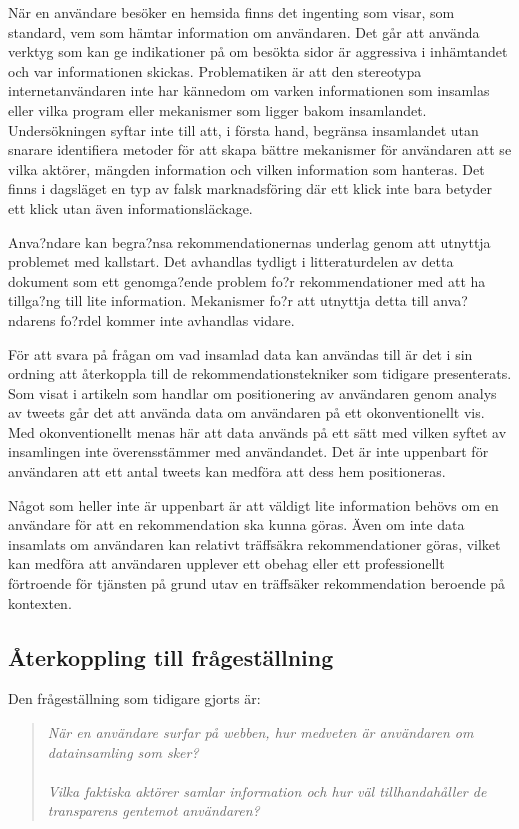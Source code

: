 \documentclass[a4paper,11pt]{article}
\begin{document}
{När en användare besöker en hemsida finns det ingenting som visar, som standard, vem som hämtar information om användaren. Det går att använda verktyg som kan ge indikationer på om besökta sidor är aggressiva i inhämtandet och var informationen skickas. Problematiken är att den stereotypa internetanvändaren inte har kännedom om varken informationen som insamlas eller vilka program eller mekanismer som ligger bakom insamlandet. Undersökningen syftar inte till att, i första hand, begränsa insamlandet utan snarare identifiera metoder för att skapa bättre mekanismer för användaren att se vilka aktörer, mängden information och vilken information som hanteras. Det finns i dagsläget en typ av falsk marknadsföring där ett klick inte bara betyder ett klick utan även informationsläckage.  

Anva?ndare kan begra?nsa rekommendationernas underlag genom att utnyttja problemet med kallstart. Det avhandlas tydligt i litteraturdelen av detta dokument som ett genomga?ende problem fo?r rekommendationer med att ha tillga?ng till lite information. Mekanismer fo?r att utnyttja detta till anva?ndarens fo?rdel kommer inte avhandlas vidare.

För att svara på frågan om vad insamlad data kan användas till är det i sin ordning att återkoppla till de rekommendationstekniker som tidigare presenterats. Som visat i artikeln som handlar om positionering av användaren genom analys av tweets går det att använda data om användaren på ett okonventionellt vis. Med okonventionellt menas här att data används på ett sätt med vilken syftet av insamlingen inte överensstämmer med användandet. Det är inte uppenbart för användaren att ett antal tweets kan medföra att dess hem positioneras. 

Något som heller inte är uppenbart är att väldigt lite information behövs om en användare för att en rekommendation ska kunna göras. Även om inte data insamlats om användaren kan relativt träffsäkra rekommendationer göras, vilket kan medföra att användaren upplever ett obehag eller ett professionellt förtroende för tjänsten på grund utav en träffsäker rekommendation beroende på kontexten. 

\subsection{Återkoppling till frågeställning}
Den frågeställning som tidigare gjorts är: 

\begin{quote}
	\textit{När en användare surfar på webben, hur medveten är användaren om datainsamling som sker?}\\\\
	\textit{Vilka faktiska aktörer samlar information och hur väl tillhandahåller de transparens gentemot användaren?}
\end{quote}

}
\end{document}
